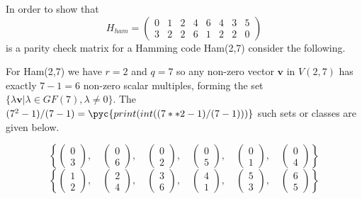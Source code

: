 In order to show that
\[
H_{ham} =
\begin{pmatrix}
0 & 1 & 2 & 4 & 6 & 4 & 3 & 5 \\ 
3 & 2 & 2 & 6 & 1 & 2 & 2 & 0
\end{pmatrix} 
\]
is a parity check matrix for a Hamming code Ham(2,7) consider the following.

For Ham(2,7) we have $r=2$ and $q=7$ so any non-zero vector $\bm{v}$ in $V(2,7)$ has exactly $7-1=6$ non-zero scalar multiples, forming the set $\{\lambda \bm{v}|\lambda \in GF(7), \lambda\neq 0\}$. The $(7^2-1)/(7-1)=\pyc{print(int((7**2-1)/(7-1)))}$ such sets or classes are given below. 

\[\left\{\begin{pmatrix}
0 \\ 3 
\end{pmatrix},\quad
\begin{pmatrix}
0 \\ 6 
\end{pmatrix},\quad
\begin{pmatrix}
0 \\ 2 
\end{pmatrix},\quad
\begin{pmatrix}
0 \\ 5 
\end{pmatrix},\quad
\begin{pmatrix}
0 \\ 1 
\end{pmatrix},\quad
\begin{pmatrix}
0 \\ 4 
\end{pmatrix}
\right\}
\]
\[\left\{\begin{pmatrix}
1 \\ 2 
\end{pmatrix},\quad
\begin{pmatrix}
2 \\ 4 
\end{pmatrix},\quad
\begin{pmatrix}
3 \\ 6 
\end{pmatrix},\quad
\begin{pmatrix}
4 \\ 1 
\end{pmatrix},\quad
\begin{pmatrix}
5 \\ 3 
\end{pmatrix},\quad
\begin{pmatrix}
6 \\ 5 
\end{pmatrix}
\right\}
\]
